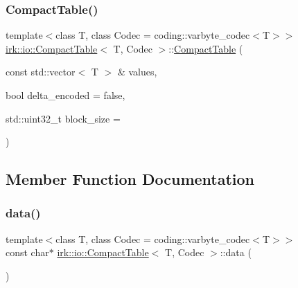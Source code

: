 \subsubsection{\texorpdfstring{Compact\+Table()}{CompactTable()}\hspace{0.1cm}{\footnotesize\ttfamily [2/2]}}
{\footnotesize\ttfamily template$<$class T, class Codec = coding\+::varbyte\+\_\+codec$<$\+T$>$$>$ \\
\mbox{\hyperlink{classirk_1_1io_1_1CompactTable}{irk\+::io\+::\+Compact\+Table}}$<$ T, Codec $>$\+::\mbox{\hyperlink{classirk_1_1io_1_1CompactTable}{Compact\+Table}} (\begin{DoxyParamCaption}\item[{const std\+::vector$<$ T $>$ \&}]{values,  }\item[{bool}]{delta\+\_\+encoded = {\ttfamily false},  }\item[{std\+::uint32\+\_\+t}]{block\+\_\+size = {} }\end{DoxyParamCaption})\hspace{0.3cm}{\ttfamily [inline]}}



\subsection{Member Function Documentation}
\mbox{\label{classirk_1_1io_1_1CompactTable_a1d8802794d6a4b2ae510668846bb1cd8}} 
\subsubsection{\texorpdfstring{data()}{data()}}
{\footnotesize\ttfamily template$<$class T, class Codec = coding\+::varbyte\+\_\+codec$<$\+T$>$$>$ \\
const char$\ast$ \mbox{\hyperlink{classirk_1_1io_1_1CompactTable}{irk\+::io\+::\+Compact\+Table}}$<$ T, Codec $>$\+::data (\begin{DoxyParamCaption}{ }\end{DoxyParamCaption})\hspace{0.3cm}{\ttfamily [inline]}}

\mbox{\label{classirk_1_1io_1_1CompactTable_a621defbc59ae57dad8f5e5ff4c79c789}} 
